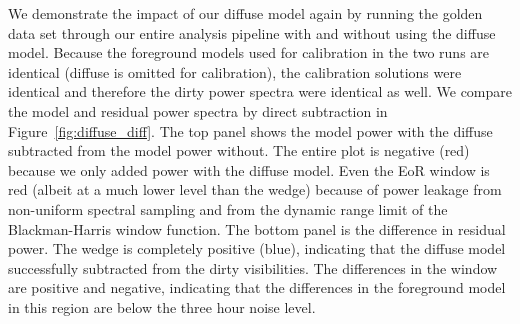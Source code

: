 \documentclass[iop]{emulateapj}
\begin{document}
We demonstrate the impact of our diffuse model again by running the golden data set 
through our entire analysis pipeline with and without using the diffuse model. Because the 
foreground models used for calibration in the two runs are identical (diffuse is omitted for 
calibration), the calibration solutions were identical and therefore the dirty power spectra 
were identical as well. We compare the model and residual power spectra by direct 
subtraction in Figure~\ref{fig:diffuse_diff}. The top panel shows the model power with the 
diffuse subtracted from the model power without. The entire plot is negative (red) because 
we only added power with the diffuse model. 
Even the EoR window is red (albeit at a much lower level than the wedge) because of power
leakage from non-uniform spectral sampling and from the dynamic range limit of the 
Blackman-Harris window function.
The bottom panel is the difference in residual 
power. The wedge is completely positive (blue), indicating that the diffuse model 
successfully subtracted from the dirty visibilities. The differences in the window are positive 
and negative, indicating that 
the differences in the foreground model in this region are below the three hour noise level.
\end{document}
